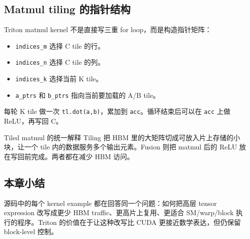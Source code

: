 \subsection{Matmul tiling 的指针结构}

Triton matmul kernel 不是直接写三重 for loop，而是构造指针矩阵：

\begin{itemize}
    \item \texttt{indices\_m} 选择 C tile 的行。
    \item \texttt{indices\_n} 选择 C tile 的列。
    \item \texttt{indices\_k} 选择当前 K tile。
    \item \texttt{a\_ptrs} 和 \texttt{b\_ptrs} 指向当前要加载的 A/B tile。
\end{itemize}

每轮 K tile 做一次 \texttt{tl.dot(a,b)}，累加到 \texttt{acc}。循环结束后可以在 \texttt{acc} 上做 ReLU，再写回 C。

\begin{importantbox}{Tiled matmul 的统一解释}
Tiling 把 HBM 里的大矩阵切成可放入片上存储的小块，让一个 tile 内的数据服务多个输出元素。Fusion 则把 matmul 后的 ReLU 放在写回前完成。两者都在减少 HBM 访问。
\end{importantbox}

\subsection{本章小结}

源码中的每个 kernel example 都在回答同一个问题：如何把高层 tensor expression 改写成更少 HBM traffic、更高片上复用、更适合 SM/warp/block 执行的程序。Triton 的价值在于让这种改写比 CUDA 更接近数学表达，但仍保留 block-level 控制。



